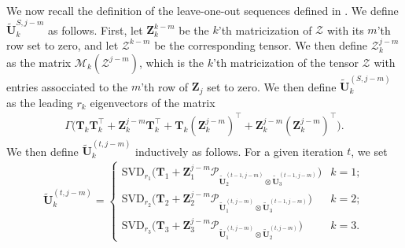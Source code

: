 \documentclass[10pt]{article}
\newcommand{\0}{{\mathbf{0}}}
\newcommand{\1}{{\mathbf{1}}}
\renewcommand{\citet}{\cite}
\renewcommand{\t}{^{\top}}
\newcommand{\utilde}{\mathbf{\tilde{U}}}
\renewcommand{\tilde}{\widetilde}
\begin{document}
We now recall the definition of the leave-one-out sequences defined in \citet{agterberg_estimating_2022}.  We define $\utilde_k^{S,j-m}$ as follows.  First, let $\mathbf{Z}_k^{k-m}$ be the $k$'th matricization of $\mathcal{Z}$ with its $m$'th row set to zero, and let $\mathcal{Z}^{k-m}$ be the corresponding tensor.  We then define $\mathcal{Z}_k^{j-m}$ as the matrix $\mathcal{M}_k(\mathcal{Z}^{j-m})$, which is the $k$'th matricization of the tensor $\mathcal{Z}$ with entries assocciated to the $m$'th row of $\mathbf{Z}_j$ set to zero.  We then define $\utilde_k^{(S,j-m)}$ as the leading $r_k$ eigenvectors of the matrix
\begin{align*}
    \Gamma\big( \mathbf{T}_k \mathbf{T}_k\t + \mathbf{Z}_k^{j-m} \mathbf{T}_k\t + \mathbf{T}_k (\mathbf{Z}_k^{j-m})\t + \mathbf{Z}_k^{j-m} (\mathbf{Z}_k^{j-m})\t \big).
\end{align*}
We then define $\utilde_k^{(t,j-m)}$ inductively as follows. For a given iteration $t$, we set
\begin{align*}
    \utilde_k^{(t,j-m)} = \begin{cases}
    \mathrm{SVD}_{r_1}\big( \mathbf{T}_1 + \mathbf{Z}_1^{j-m} \mathcal{P}_{\utilde_{2}^{(t-1,j-m)} \otimes \utilde_{3}^{(t-1,j-m)}} \big)& k = 1; \\
    \mathrm{SVD}_{r_2}\big( \mathbf{T}_2 + \mathbf{Z}_2^{j-m} \mathcal{P}_{\utilde_{1}^{(t,j-m)} \otimes \utilde_{3}^{(t-1,j-m)}} \big)& k =2; \\\mathrm{SVD}_{r_3}\big( \mathbf{T}_3 + \mathbf{Z}_3^{j-m} \mathcal{P}_{\utilde_{1}^{(t,j-m)} \otimes \utilde_{2}^{(t,j-m)}} \big)& k = 3. \end{cases}
\end{align*}
\end{document}
